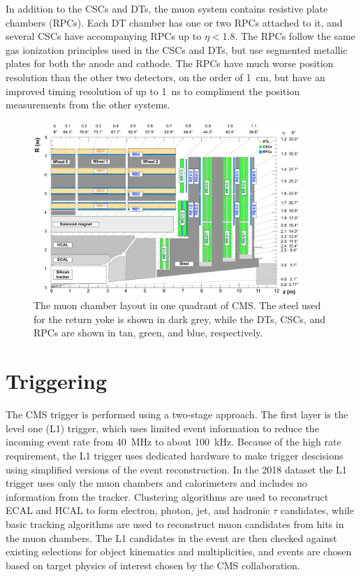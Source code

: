 In addition to the CSCs and DTs, the muon system contains resistive plate chambers (RPCs). 
Each DT chamber has one or two RPCs attached to it, and several CSCs have accompanying RPCs up to $\eta<$1.8. 
The RPCs follow the same gas ionization principles used in the CSCs and DTs, but use segmented metallic plates for both the anode and cathode.
The RPCs have much worse position resolution than the other two detectors, on the order of \SI{1}{\centi\meter}, but have an improved timing resolution of up to \SI{1}{\nano\second} to compliment the position measurements from the other systems.

\begin{figure}[h]
    \includegraphics[width=0.9\textwidth]{figures/cms_quadrant_run_ii.pdf}
    \centering
    \caption[Muon chamber layout in Run 2]{The muon chamber layout in one quadrant of CMS. The steel used for the return yoke is shown in dark grey, while the DTs, CSCs, and RPCs are shown in tan, green, and blue, respectively.}
    \label{fig:cscLayout}
\end{figure}

\section{Triggering}
The CMS trigger is performed using a two-stage approach. The first layer is the level one (L1) trigger, which uses limited event information to reduce the incoming event rate from \SI{40}{\mega\hertz} to about \SI{100}{\kilo\hertz}. 
Because of the high rate requirement, the L1 trigger uses dedicated hardware to make trigger descisions using simplified versions of the event reconstruction.
In the 2018 dataset the L1 trigger uses only the muon chambers and calorimeters and includes no information from the tracker.
Clustering algorithms are used to reconstruct ECAL and HCAL to form electron, photon, jet, and hadronic $\tau$ candidates, while basic tracking algorithms are used to reconstruct muon candidates from hits in the muon chambers.
The L1 candidates in the event are then checked against existing selections for object kinematics and multiplicities, and events are chosen based on target physics of interest chosen by the CMS collaboration.

